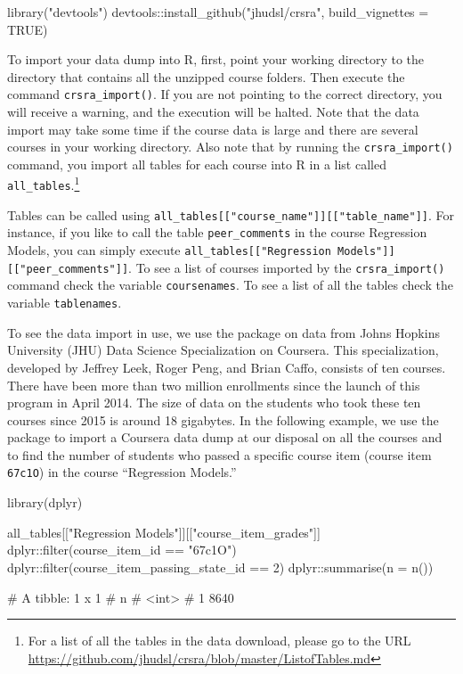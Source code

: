\begin{Schunk}
\begin{Sinput}
library("devtools")
devtools::install_github("jhudsl/crsra", build_vignettes = TRUE)
\end{Sinput}
\end{Schunk}

To import your data dump into R, first, point your working directory to
the directory that contains all the unzipped course folders. Then
execute the command \texttt{crsra\_import()}. If you are not pointing to
the correct directory, you will receive a warning, and the execution
will be halted. Note that the data import may take some time if the
course data is large and there are several courses in your working
directory. Also note that by running the \texttt{crsra\_import()}
command, you import all tables for each course into R in a list called
\texttt{all\_tables}.\footnote{For a list of all the tables in the data download, please go to the URL \url{https://github.com/jhudsl/crsra/blob/master/ListofTables.md}}

Tables can be called using
\texttt{all\_tables{[}{[}"course\_name"{]}{]}{[}{[}"table\_name"{]}{]}}.
For instance, if you like to call the table \texttt{peer\_comments} in
the course Regression Models, you can simply execute
\texttt{all\_tables{[}{[}"Regression\ Models"{]}{]}{[}{[}"peer\_comments"{]}{]}}.
To see a list of courses imported by the \texttt{crsra\_import()}
command check the variable \texttt{coursenames}. To see a list of all
the tables check the variable \texttt{tablenames}.

To see the data import in use, we use the package on data from Johns
Hopkins University (JHU) Data Science Specialization on Coursera. This
specialization, developed by Jeffrey Leek, Roger Peng, and Brian Caffo,
consists of ten courses. There have been more than two million
enrollments since the launch of this program in April 2014. The size of
data on the students who took these ten courses since 2015 is around 18
gigabytes. In the following example, we use the  package to
import a Coursera data dump at our disposal on all the courses and to
find the number of students who passed a specific course item (course
item \texttt{67c1O}) in the course ``Regression Models.''

\begin{Schunk}
\begin{Sinput}
library(dplyr)

all_tables[["Regression Models"]][["course_item_grades"]] %
    dplyr::filter(course_item_id == "67c1O") %
    dplyr::filter(course_item_passing_state_id == 2) %
    dplyr::summarise(n = n())

# A tibble: 1 x 1
#      n
#   <int>
# 1  8640
\end{Sinput}
\end{Schunk}

